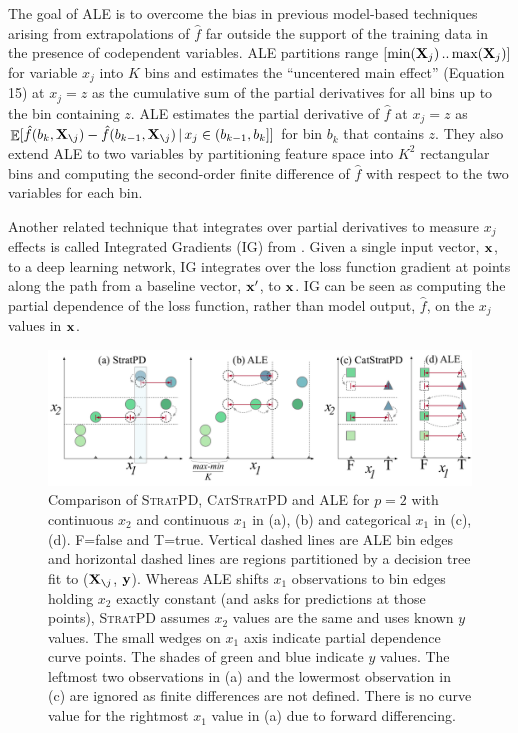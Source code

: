\documentclass[]{article} %
\newcommand{\spd}{\fontfamily{cmr}\textsc{\small StratPD}}
\newcommand{\cspd}{\fontfamily{cmr}\textsc{\small CatStratPD}}
\newcommand{\Xnj}{${\bf X}_{\texttt{\char`\\} j}$}
\renewcommand{\slash}{\texttt{\char`\\}}
\DeclareMathOperator{\Ex}{\mathbb{E}}
\begin{document}

The goal of ALE \citep{ALE} is to overcome the bias in previous model-based techniques arising from extrapolations of $\hat{f}$ far outside the support of the training data in the presence of codependent variables.   ALE  partitions range $[\text{min}({\bf X}_j) \,..\, \text{max}({\bf X}_j)]$ for variable $x_j$ into $K$ bins and estimates the ``uncentered main effect'' (Equation 15) at $x_j = z$ as the cumulative sum of the partial derivatives for all bins up to the bin containing $z$. ALE estimates the partial derivative of $\hat{f}$ at $x_j=z$ as $\Ex[\hat{f}(b_k, {\bf X}_{\slash j}) - \hat{f}(b_{k-1}, {\bf X}_{\slash j}) \, | \, x_j \in (b_{k-1},b_k]]$ for bin $b_k$ that contains $z$. They also extend ALE to two variables by partitioning feature space into $K^2$ rectangular bins and computing the  second-order finite difference of $\hat{f}$ with respect to the two variables for each bin. 

Another related technique that integrates over partial derivatives to measure $x_j$ effects is called Integrated Gradients (IG) from \citet{intgrad}. Given a single input vector, $\bf x$, to a deep learning network, IG integrates over the loss function gradient at points along the path from a baseline vector, $\bf x'$, to $\bf x$. IG can be seen as computing the partial dependence of the loss function, rather than model output, $\hat{f}$, on the $x_j$ values in ${\bf x}$.

\begin{figure}[!htbp]
\begin{center}
\includegraphics[scale=.4]{images/partitioning.pdf}\vspace{-3mm}
\caption{\small Comparison of \spd, \cspd{} and ALE for $p=2$ with continuous $x_2$ and continuous $x_1$ in (a), (b) and  categorical $x_1$ in (c), (d).  F=false and T=true. Vertical dashed lines are ALE bin edges and horizontal dashed lines are regions partitioned by a decision tree fit to (\Xnj, ${\bf y}$). Whereas ALE shifts $x_1$ observations to bin edges holding $x_2$ exactly constant (and asks for predictions at those points), \spd{} assumes $x_2$ values are the same and uses known $y$ values. The small wedges on $x_1$ axis indicate partial dependence curve points.  The shades of green and blue indicate $y$ values. The leftmost two observations in (a) and the lowermost observation in (c) are ignored as finite differences are not defined. There is no curve value for the rightmost $x_1$ value in (a) due to forward differencing.}
\label{fig:partitioning}
\end{center}
\end{figure}
\end{document}

